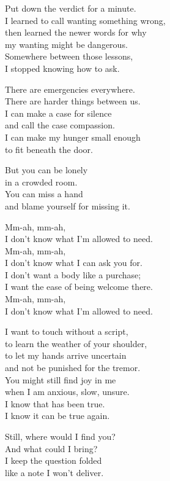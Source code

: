 \begin{lyrics}
Put down the verdict for a minute.\\
I learned to call wanting something wrong,\\
then learned the newer words for why\\
my wanting might be dangerous.\\
Somewhere between those lessons,\\
I stopped knowing how to ask.

There are emergencies everywhere.\\
There are harder things between us.\\
I can make a case for silence\\
and call the case compassion.\\
I can make my hunger small enough\\
to fit beneath the door.

But you can be lonely\\
in a crowded room.\\
You can miss a hand\\
and blame yourself for missing it.

Mm-ah, mm-ah,\\
I don't know what I'm allowed to need.\\
Mm-ah, mm-ah,\\
I don't know what I can ask you for.\\
I don't want a body like a purchase;\\
I want the ease of being welcome there.\\
Mm-ah, mm-ah,\\
I don't know what I'm allowed to need.

I want to touch without a script,\\
to learn the weather of your shoulder,\\
to let my hands arrive uncertain\\
and not be punished for the tremor.\\
You might still find joy in me\\
when I am anxious, slow, unsure.\\
I know that has been true.\\
I know it can be true again.

Still, where would I find you?\\
And what could I bring?\\
I keep the question folded\\
like a note I won't deliver.


\end{lyrics}
